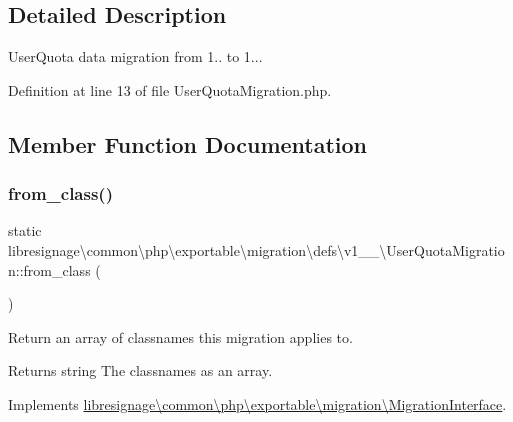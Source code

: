 \subsection{Detailed Description}
User\+Quota data migration from 1.. to 1... 

Definition at line 13 of file User\+Quota\+Migration.\+php.



\subsection{Member Function Documentation}
\mbox{\label{classlibresignage_1_1common_1_1php_1_1exportable_1_1migration_1_1defs_1_1v1__1__0_1_1UserQuotaMigration_a62a360e324642c453ebc35b29d7ccbb1}} 
\subsubsection{\texorpdfstring{from\+\_\+class()}{from\_class()}}
{\footnotesize\ttfamily static libresignage\textbackslash{}common\textbackslash{}php\textbackslash{}exportable\textbackslash{}migration\textbackslash{}defs\textbackslash{}v1\+\_\+\_\textbackslash{}\+User\+Quota\+Migration\+::from\+\_\+class (\begin{DoxyParamCaption}{ }\end{DoxyParamCaption})\hspace{0.3cm}{\ttfamily [static]}}

Return an array of classnames this migration applies to.

\begin{DoxyReturn}{Returns}
string The classnames as an array. 
\end{DoxyReturn}


Implements \hyperlink{interfacelibresignage_1_1common_1_1php_1_1exportable_1_1migration_1_1MigrationInterface_aa8eb2e4ff59358ae551061687540f724}{libresignage\textbackslash{}common\textbackslash{}php\textbackslash{}exportable\textbackslash{}migration\textbackslash{}\+Migration\+Interface}.



